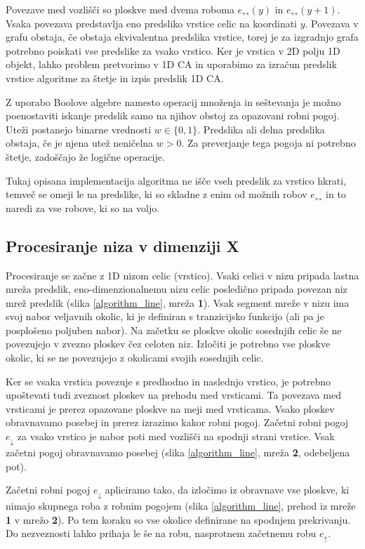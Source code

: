 \documentclass[12pt,a4paper,openany,twoside]{book}
\begin{document}
Povezave med vozlišči so ploskve med dvema roboma
\(e_{\leftrightarrow}(y)\) in \(e_{\leftrightarrow}(y+1)\).
Vsaka povezava predstavlja eno predsliko vrstice celic na koordinati \(y\).
Povezava v grafu obstaja, če obstaja ekvivalentna predslika vrstice,
torej je za izgradnjo grafa potrebno poiskati vse predslike za vsako vrstico.
Ker je vrstica v 2D polju 1D objekt, lahko problem pretvorimo v 1D CA in
uporabimo za izračun predslik vrstice algoritme za štetje in izpis predslik 1D CA.

Z uporabo Boolove algebre namesto operacij množenja in seštevanja
je možno poenostaviti iskanje predslik samo na njihov obstoj za opazovani robni pogoj.
Uteži postanejo binarne vrednosti \(w \in \{0, 1\}\).
Predslika ali delna predslika obstaja, če je njena utež neničelna \(w>0\).
Za preverjanje tega pogoja ni potrebno štetje, zadoščajo že logične operacije.

Tukaj opisana implementacija algoritma ne išče vseh predslik za vrstico hkrati,
temveč se omeji le na predslike, ki so skladne z enim od možnih robov
\(e_{\leftrightarrow}\) in to naredi za vse robove, ki so na voljo.

\subsection{Procesiranje niza v dimenziji X}

Procesiranje se začne z 1D nizom celic (vrstico).
Vsaki celici v nizu pripada lastna mreža predslik, eno-dimenzionalnemu nizu celic
posledično pripada povezan niz mrež predslik (slika \ref{algorithm_line}, mreža \textbf{1}).
Vsak segment mreže v nizu ima svoj nabor veljavnih okolic,
ki je definiran s tranzicijsko funkcijo (ali pa je posplošeno poljuben nabor).
Na začetku se ploskve okolic sosednjih celic še ne povezujejo v
zvezno ploskev čez celoten niz. Izločiti je potrebno vse ploskve okolic,
ki se ne povezujejo z okolicami svojih sosednjih celic.

Ker se vsaka vrstica povezuje s predhodno in naslednjo vrstico, je potrebno
upoštevati tudi zveznost ploskev na prehodu med vrsticami.
Ta povezava med vrsticami je prerez opazovane ploskve na meji med vrsticama.
Vsako ploskev obravnavamo posebej in prerez izrazimo kakor robni pogoj.
Začetni robni pogoj \(e_{\downarrow}\) za vsako vrstico
je nabor poti med vozlišči na spodnji strani vrstice.
Vsak začetni pogoj obravnavamo posebej (slika \ref{algorithm_line}, mreža \textbf{2}, odebeljena pot).

Začetni robni pogoj \(e_{\downarrow}\) apliciramo tako,
da izločimo iz obravnave vse ploskve,
ki nimajo skupnega roba z robnim pogojem (slika \ref{algorithm_line},
prehod iz mreže \textbf{1} v mrežo \textbf{2}).
Po tem koraku so vse okolice definirane na spodnjem prekrivanju.
Do nezveznosti lahko prihaja le še na robu,
nasprotnem začetnemu robu \(e_{\uparrow}\).
\end{document}
